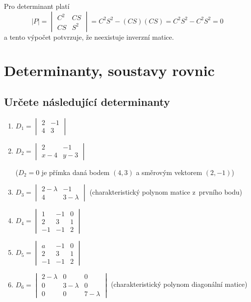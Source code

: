 Pro determinant platí
\begin{equation*}
  |P|=
  \begin{vmatrix}
      C^2 & CS \\
CS & S^2
  \end{vmatrix}
=C^2S^2-(CS)(CS)=C^2S^2-C^2S^2=0
\end{equation*}
a tento výpočet potvrzuje, že neexistuje inverzní matice.
\konec


\stranka
\section{Determinanty, soustavy rovnic}

\stranka
\subsection{Určete následující determinanty}

\begin{enumerate}
\item $D_1=
  \begin{vmatrix}
    2 & -1 \\ 4 &3
  \end{vmatrix}
  $
\item $D_2=
  \begin{vmatrix}
    2 & -1 \\ x-4 &y-3
  \end{vmatrix}
  $

  ($D_2=0$ je přímka daná bodem $(4,3)$ a směrovým vektorem $(2,-1)$)
\item $D_3=
  \begin{vmatrix}
    2-\lambda & -1 \\ 4 & 3-\lambda
  \end{vmatrix}
  $ (charakteristický polynom matice z prvního bodu)
\item
  $D_4=
  \begin{vmatrix}
    1 & -1 & 0\\ 2 & 3 & 1 \\ -1 &-1 & 2\end{vmatrix}
  $
\item
  $D_5=
  \begin{vmatrix}
    a & -1 & 0\\ 2 & 3 & 1 \\ -1 &-1 & 2\end{vmatrix}
  $  
\item
  $D_6=
  \begin{vmatrix}
    2-\lambda & 0 & 0\\ 0 & 3-\lambda & 0 \\ 0 & 0& 7-\lambda \end{vmatrix}
  $  (charakteristický polynom diagonální matice)
\end{enumerate}


